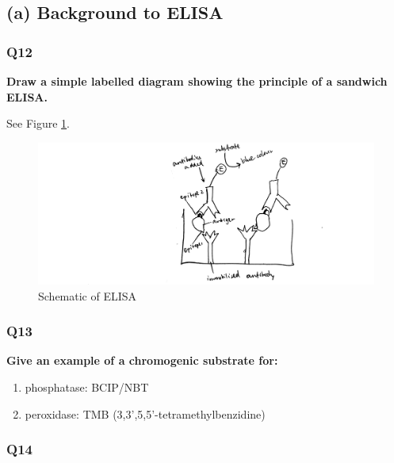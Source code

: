 \documentclass[
]{article}
\providecommand{\tightlist}{%
  \setlength{\itemsep}{0pt}\setlength{\parskip}{0pt}}
\begin{document}
\hypertarget{a-background-to-elisa}{%
\subsection*{(a) Background to ELISA}\label{a-background-to-elisa}}

\hypertarget{q12}{%
\subsubsection*{Q12}\label{q12}}

\textbf{Draw a simple labelled diagram showing the principle of a sandwich ELISA.}

See Figure \ref{fig:immunolab-elisa}.

\begin{figure}
\includegraphics[width=1\linewidth]{../img/immunolab-elisa} \caption{Schematic of ELISA}\label{fig:immunolab-elisa}
\end{figure}

\hypertarget{q13}{%
\subsubsection*{Q13}\label{q13}}

\textbf{Give an example of a chromogenic substrate for:}

\begin{enumerate}
\def\labelenumi{(\roman{enumi})}
\tightlist
\item
  phosphatase: BCIP/NBT
\item
  peroxidase: TMB (3,3',5,5'-tetramethylbenzidine)
\end{enumerate}

\hypertarget{q14}{%
\subsubsection*{Q14}\label{q14}}
\end{document}
